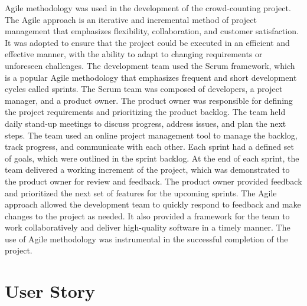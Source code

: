 \documentclass[12pt]{report}
\begin{document}
Agile methodology was used in the development of the crowd-counting project. The Agile approach is an iterative and incremental method of project management that emphasizes flexibility, collaboration, and customer satisfaction. It was adopted to ensure that the project could be executed in an efficient and effective manner, with the ability to adapt to changing requirements or unforeseen challenges. The development team used the Scrum framework, which is a popular Agile methodology that emphasizes frequent and short development cycles called sprints.
\newline \newline
The Scrum team was composed of developers, a project manager, and a product owner. The product owner was responsible for defining the project requirements and prioritizing the product backlog. The team held daily stand-up meetings to discuss progress, address issues, and plan the next steps. The team used an online project management tool to manage the backlog, track progress, and communicate with each other.
\newline \newline
Each sprint had a defined set of goals, which were outlined in the sprint backlog. At the end of each sprint, the team delivered a working increment of the project, which was demonstrated to the product owner for review and feedback. The product owner provided feedback and prioritized the next set of features for the upcoming sprints.
\newline \newline
The Agile approach allowed the development team to quickly respond to feedback and make changes to the project as needed. It also provided a framework for the team to work collaboratively and deliver high-quality software in a timely manner. The use of Agile methodology was instrumental in the successful completion of the project.
\newline


\section{User Story}
\end{document}
